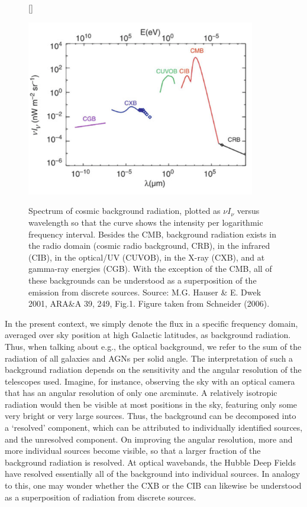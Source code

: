 \documentclass[a4paper,11pt]{article}
\begin{document}
\begin{figure}[h]
    [\FBwidth]
    {\caption{\footnotesize{Spectrum of cosmic background radiation, plotted as $\nu I_\nu$ versus wavelength so that the curve shows the intensity per logarithmic frequency interval. Besides the CMB, background radiation exists in the radio domain (cosmic radio background, CRB), in the infrared (CIB), in the optical/UV (CUVOB), in the X-ray (CXB), and at gamma-ray energies (CGB). With the exception of the CMB, all of these backgrounds can be understood as a superposition of the emission from discrete sources. Source: M.G. Hauser \& E. Dwek 2001, ARA\&A 39, 249, Fig.1. Figure taken from Schneider (2006).}}
    \label{fig:diffusebackground}}
    {\includegraphics[width=10cm]{figures/DiffuseBackground.png}}
\end{figure}

{\noindent}In the present context, we simply denote the flux in a specific frequency domain, averaged over sky position at high Galactic latitudes, as background radiation. Thus, when talking about e.g., the optical background, we refer to the sum of the radiation of all galaxies and AGNs per solid angle. The interpretation of such a background radiation depends on the sensitivity and the angular resolution of the telescopes used. Imagine, for instance, observing the sky with an optical camera that has an angular resolution of only one arcminute. A relatively isotropic radiation would then be visible at most positions in the sky, featuring only some very bright or very large sources. Thus, the background can be decomposed into a `resolved' component, which can be attributed to individually identified sources, and the unresolved component. On improving the angular resolution, more and more individual sources become visible, so that a larger fraction of the background radiation is resolved. At optical wavebands, the Hubble Deep Fields have resolved essentially all of the background into individual sources. In analogy to this, one may wonder whether the CXB or the CIB can likewise be understood as a superposition of radiation from discrete sources.
\end{document}
